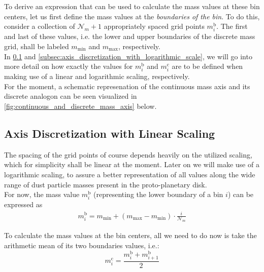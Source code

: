     To derive an expression that can be used to calculate the mass values at these bin centers, 
    let us first define the mass values at the \textit{boundaries of the bin}. To do this,
    consider a collection of $\mathcal N_m+1$ appropriately spaced grid points $m_i^\text{b}$. 
    The first and last of these values, i.e. the lower and upper boundaries of the discrete mass 
    grid, shall be labeled $m_\text{min}$ and $m_\text{max}$, respectively. \\

    In \cref{subsec:axis_discretization_with_linear_scale} and
    \cref{subsec:axis_discretization_with_logarithmic_scale}, we will go into more detail on how 
    exactly the values for $m_i^\text{b}$ and $m_i^\text{c}$ are to be defined when making use of 
    a linear and logarithmic scaling, respectively. \\

    For the moment, a schematic represenation of the continuous mass axis and its discrete analogon
    can be seen visualized in \cref{fig:continuous_and_discrete_mass_axis} below.

    

    \subsection{Axis Discretization with Linear Scaling}
    \label{subsec:axis_discretization_with_linear_scale}

        The spacing of the grid points of course depends heavily on the utilized scaling, which for 
        simplicity shall be linear at the moment. Later on we will make use of a logarithmic scaling,
        to assure a better representation of all values along the wide range of dust particle masses 
        present in the proto-planetary disk.\\
    
        For now, the mass value $m_i^\text{b}$ (representing the lower boundary of a bin $i$) can be 
        expressed as
        \begin{align}
          m_i^\text{b}=m_\text{min}+(m_\text{max}-m_\text{min})\cdot\frac{i}{\mathcal N_m}
        \end{align}
    
        To calculate the mass values at the bin centers, all we need to do now is take the arithmetic 
        mean of its two boundaries values, i.e.:
        \begin{equation}
            m_i^\text{c}
                =\frac{m_i^\text{b}+m_{i+1}^\text{b}}{2}
        \end{equation}
        
